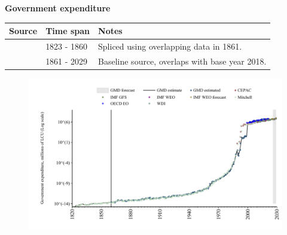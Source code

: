 \documentclass[12pt,a4paper,landscape]{article}
\begin{document}
\begin{adjustbox}{max totalsize={\paperwidth}{\paperheight},center}
\begin{minipage}[t][\textheight][t]{\textwidth}
\vspace*{0.5cm}
{}
\begin{center}
{\Large\bfseries Government expenditure}
\end{center}
\vspace{0.5cm}
\begin{table}[H]
\centering
\small
\begin{tabular}{|l|l|l|}
\hline
\textbf{Source} & \textbf{Time span} & \textbf{Notes} \\
\hline
\rowcolor{white}\cite{Mitchell}& 1823 - 1860 &Spliced using overlapping data in 1861. \\
\rowcolor{lightgray}\cite{GMD_estimated}& 1861 - 2029 &Baseline source, overlaps with base year 2018. \\
\hline
\end{tabular}
\end{table}
\begin{figure}[H]
\centering
\includegraphics[width=\textwidth,height=0.6\textheight,keepaspectratio]{graphs/BRA_govexp.pdf}
\end{figure}
\end{minipage}
\end{adjustbox}
\end{document}
